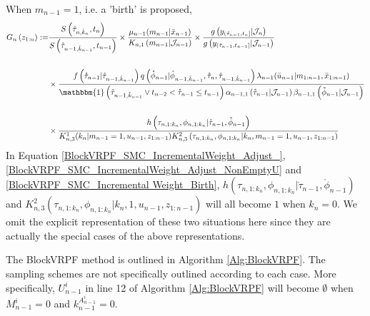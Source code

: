 \documentclass[12pt,a4paper]{article}
\begin{document}
When $m_{n-1} = 1$, i.e. a 'birth' is proposed, 
\begin{equation}
    \label{BlockVRPF_SMC_Incremental Weight_Birth}
    \begin{split}
    G_{n}\left(z_{1:n}\right) :=& \frac{S\left(\hat{\tau}_{n,\hat{k}_n},t_n\right)}{S\left(\hat{\tau}_{n-1,\hat{k}_{n-1}},t_{n-1}\right)} \times \frac{\mu_{n-1}(m_{n-1}|\bar{x}_{n-1})}{K_{n,1}\left(m_{n-1}|\mathcal{J}_{n-1}\right)}\times \frac{g\left(y_{(\mathring{\tau}_{n-1},t_n]}|\mathcal{J}_n\right)}{g\left(y_{(\mathring{\tau}_{n-1},t_{n-1}]}|\mathcal{J}_{n-1}\right)}\\\\ 
     & \times \frac{f\left(\mathring{\tau}_{n-1}|\hat{\tau}_{n-1,\hat{k}_{n-1}}\right)q\left(\mathring{\phi}_{n-1}|\hat{\phi}_{n-1,\hat{k}_{n-1}},\mathring{\tau}_{n},\hat{\tau}_{n-1,\hat{k}_{n-1}}\right)\lambda_{n-1}(\bar{u}_{n-1}|m_{1:n-1},\bar{x}_{1:n-1})}{\mathbbm{1}\left(\hat{\tau}_{n-1,\hat{k}_{n-1}} \vee t_{n-2}  < \mathring{\tau}_{n-1} \leq t_{n-1} \right)\alpha_{n-1,1}\left(\mathring{\tau}_{n-1}|\mathcal{J}_{n-1}\right)\beta_{n-1,1}\left(\mathring{\phi}_{n-1}|\mathcal{J}_{n-1}\right)}\\\\
     & \times \frac{h\left(\tau_{n,1:k_n},\phi_{n,1:k_n}|\mathring{\tau}_{n-1},\mathring{\phi}_{n-1}\right)}{K_{n,3}^1(k_n|m_{n-1}=1,u_{n-1},z_{1:n-1})K_{n,3}^{2}\left(\tau_{n,1:k_n},\phi_{n,1:k_n}|k_n,m_{n-1}=1,u_{n-1},z_{1:n-1}\right)}
     \end{split}
\end{equation}
In Equation \eqref{BlockVRPF_SMC_IncrementalWeight_Adjust_}, \eqref{BlockVRPF_SMC_IncrementalWeight_Adjust_NonEmptyU} and \eqref{BlockVRPF_SMC_Incremental Weight_Birth}, $h\left(\tau_{n,1:k_n},\phi_{n,1:k_n}|\mathring{\tau}_{n-1},\mathring{\phi}_{n-1}\right)$ and $K_{n,3}^{2}\left(\tau_{n,1:k_n},\phi_{n,1:k_n}|k_n,1,u_{n-1},z_{1:n-1}\right)$ will all become $1$ when $k_n=0$. We omit the explicit representation of these two situations here since they are actually the special cases of the above representations. 

The BlockVRPF method is outlined in Algorithm \ref{Alg:BlockVRPF}. The sampling schemes are not specifically outlined according to each case. More specifically, $U_{n-1}^i$ in line 12 of Algorithm \ref{Alg:BlockVRPF} will become $\emptyset$ when $M_{n-1}^i = 0$ and $k_{n-1}^{A_{n-1}^i} = 0$. 
\end{document}
